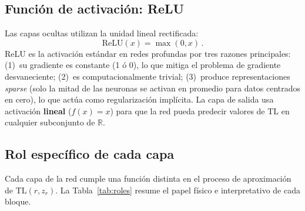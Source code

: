 \documentclass[12pt,a4paper]{article}
\newcommand{\TL}{\mathrm{TL}}
\begin{document}
\subsection{Función de activación: ReLU}

Las capas ocultas utilizan la unidad lineal rectificada:
\begin{equation}
  \mathrm{ReLU}(x) = \max(0, x)\,.
  \label{eq:relu}
\end{equation}
ReLU es la activación estándar en redes profundas por tres razones principales:
(1)~su gradiente es constante (1 ó 0), lo que mitiga el problema de gradiente
desvaneciente; (2)~es computacionalmente trivial; (3)~produce representaciones
\emph{sparse} (solo la mitad de las neuronas se activan en promedio para datos
centrados en cero), lo que actúa como regularización implícita.
La capa de salida usa activación \textbf{lineal} ($f(x)=x$) para que la red
pueda predecir valores de TL en cualquier subconjunto de $\mathbb{R}$.

\subsection{Rol específico de cada capa}
\label{sec:roles_capas}

Cada capa de la red cumple una función distinta en el proceso de aproximación
de $\TL(r,z_r)$. La Tabla~\ref{tab:roles} resume el papel físico e
interpretativo de cada bloque.
\end{document}
